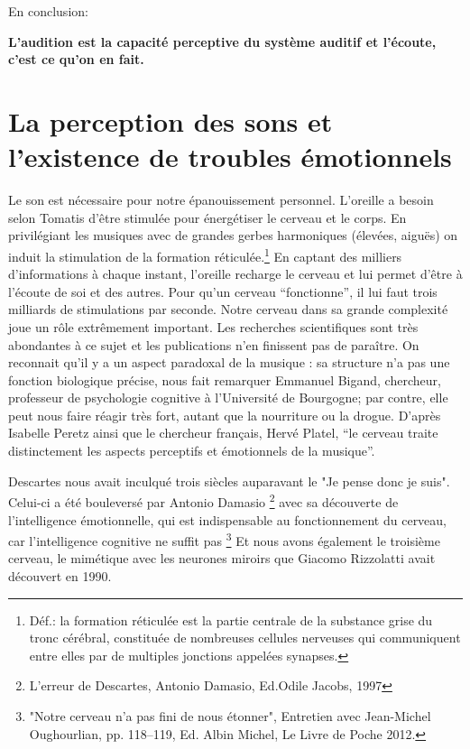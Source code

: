 En conclusion:


 \textbf{ L'audition est la capacité perceptive du système auditif et l'écoute, c'est ce qu'on en fait.}


\section{La perception des sons et l'existence de troubles
  émotionnels}

         Le son est nécessaire pour 
notre
		épanouissement personnel. L'oreille a besoin selon Tomatis d'être stimulée 
pour
		énergétiser le cerveau et le corps. En privilégiant les 
musiques avec
		de grandes gerbes harmoniques (élevées, aiguës) on
                 induit la 
stimulation
		de la formation réticulée.\footnote{Déf.: la formation 
réticulée est la partie centrale de la substance grise du tronc cérébral, 
constituée de nombreuses cellules nerveuses qui communiquent entre elles par de 
multiples jonctions appelées synapses.} En captant des milliers d'informations
		à chaque instant, l'oreille recharge le cerveau et lui permet 
d'être
		à l'écoute de soi et des autres. Pour qu'un cerveau 
``fonctionne'',
		il lui faut trois milliards de stimulations par seconde.
Notre cerveau  dans sa grande complexité joue un rôle extrêmement important.
Les recherches scientifiques sont très abondantes à ce sujet et les publications n'en finissent pas de paraître.
On reconnait qu'il y a un aspect paradoxal de la musique : sa structure n'a pas une 
fonction biologique précise, nous fait remarquer Emmanuel Bigand,  chercheur, professeur 
de psychologie cognitive à l'Université 
de Bourgogne; par contre, elle peut nous faire réagir très fort, autant que la nourriture ou la 
drogue. \autocite[Voir ch. 3 p. 35, "Vous avez l'oreille musicale"]{bigand:cerveau}
D'après Isabelle Peretz
\autocite[<<\,Les agnosies auditives\,>>, pp. 205--216]{seron.baron.ea:neuropsychologie}
ainsi que le chercheur français, Hervé Platel,%
\autocite[pp. 223--224]{platel_neuropsychology_2002}
 \enquote{le cerveau traite distinctement les aspects perceptifs et émotionnels de la 
 musique}.

Descartes nous avait inculqué trois siècles auparavant le "Je pense donc je suis". Celui-ci  a 
été bouleversé par Antonio Damasio \footnote {{L'erreur de Descartes}, Antonio Damasio, 
Ed.Odile Jacobs, 1997} 
avec sa découverte de l'intelligence émotionnelle, qui est indispensable au fonctionnement 
du 
cerveau, car  l'intelligence cognitive ne suffit pas%
\footnote{"Notre cerveau n'a pas fini de nous étonner", Entretien avec Jean-Michel 
     Oughourlian, pp. 118--119, Ed. Albin Michel, Le Livre de Poche 2012.}
Et nous avons  également le troisième cerveau, le mimétique avec les neurones miroirs que Giacomo Rizzolatti avait découvert en 1990.
 
